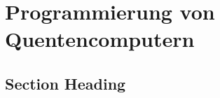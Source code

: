 \chapter{Programmierung von Quentencomputern}
\label{programming} %



\section{Section Heading}



